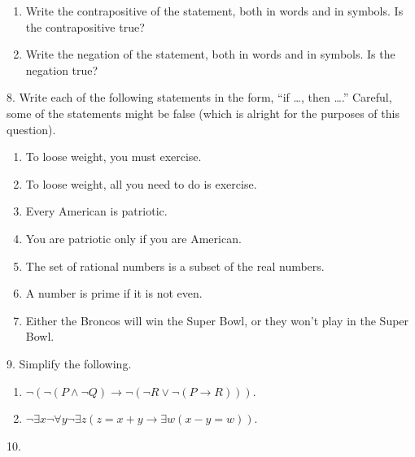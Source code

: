 \documentclass[10pt,]{book}
\theoremstyle{plain}
\theoremstyle{definition}
\numberwithin{equation}{chapter}
\def\imp{\rightarrow}
\begin{document}
\begin{exerciselist}
\begin{enumerate}[label=(\alph*)]
\item\hypertarget{li-731}{}
            Write the contrapositive of the statement, both in words and in symbols. Is the contrapositive true?
\item\hypertarget{li-732}{}
            Write the negation of the statement, both in words and in symbols. Is the negation true?
\end{enumerate}
\par\smallskip
\item[8.]\hypertarget{exercise-269}{}
        Write each of the following statements in the form, ``if \dots{}, then \dots{}.'' Careful, some of the statements might be false (which is alright for the purposes of this question).
\leavevmode%
\begin{enumerate}[label=(\alph*)]
\item\hypertarget{li-737}{}
            To loose weight, you must exercise.
\item\hypertarget{li-738}{}
            To loose weight, all you need to do is exercise.
\item\hypertarget{li-739}{}
            Every American is patriotic.
\item\hypertarget{li-740}{}
            You are patriotic only if you are American.
\item\hypertarget{li-741}{}
            The set of rational numbers is a subset of the real numbers.
\item\hypertarget{li-742}{}
            A number is prime if it is not even.
\item\hypertarget{li-743}{}
            Either the Broncos will win the Super Bowl, or they won't play in the Super Bowl.
\end{enumerate}
\par\smallskip
\item[9.]\hypertarget{exercise-270}{}
        Simplify the following.
\leavevmode%
\begin{enumerate}[label=(\alph*)]
\item\hypertarget{li-751}{}\(\neg (\neg (P \wedge \neg Q) \imp \neg(\neg R \vee \neg(P \imp R)))\).%
\item\hypertarget{li-752}{}\(\neg \exists x \neg \forall y \neg \exists z (z = x + y \imp \exists w (x - y = w))\).%
\end{enumerate}
\par\smallskip
\item[10.]\hypertarget{exercise-271}{}

\end{exerciselist}
\end{document}
